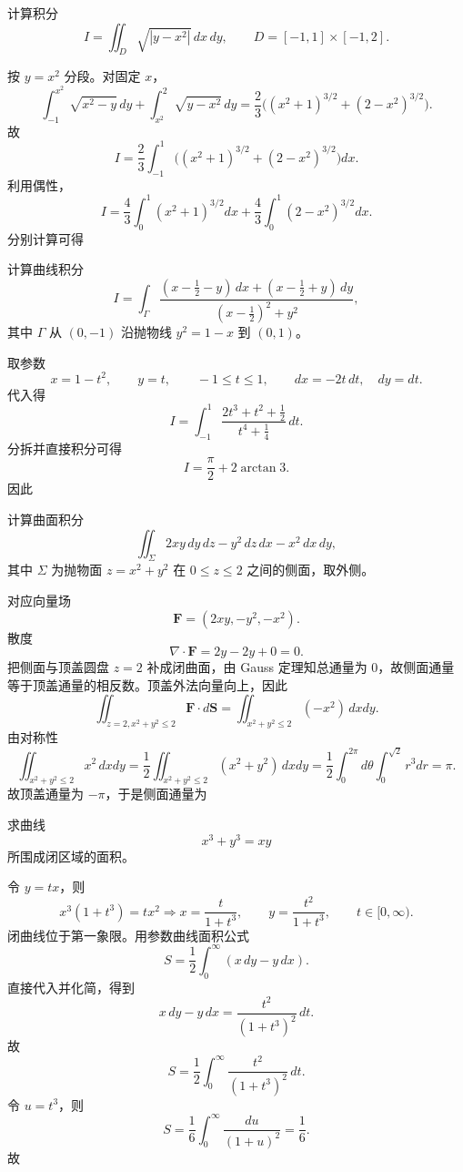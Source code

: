 ﻿


\begin{question}
计算积分
\[
I=\iint_D \sqrt{|y-x^2|}\,dx\,dy,
\qquad D=[-1,1]\times[-1,2].
\]

\begin{solution}

按 $y=x^2$ 分段。对固定 $x$，
\[
\int_{-1}^{x^2}\sqrt{x^2-y}\,dy+\int_{x^2}^{2}\sqrt{y-x^2}\,dy
=\frac23\bigl((x^2+1)^{3/2}+(2-x^2)^{3/2}\bigr).
\]
故
\[
I=\frac23\int_{-1}^{1}\bigl((x^2+1)^{3/2}+(2-x^2)^{3/2}\bigr)dx.
\]
利用偶性，
\[
I=\frac43\int_0^1(x^2+1)^{3/2}dx+\frac43\int_0^1(2-x^2)^{3/2}dx.
\]
分别计算可得
\end{solution}
\end{question}

\begin{question}
计算曲线积分
\[
I=\int_{\Gamma}\frac{(x-\tfrac12-y)\,dx+(x-\tfrac12+y)\,dy}{(x-\tfrac12)^2+y^2},
\]
其中 $\Gamma$ 从 $(0,-1)$ 沿抛物线 $y^2=1-x$ 到 $(0,1)$。
\begin{solution}

取参数
\[
 x=1-t^2,\qquad y=t,\qquad -1\le t\le1,
\qquad dx=-2t\,dt,\quad dy=dt.
\]
代入得
\[
I=\int_{-1}^{1}\frac{2t^3+t^2+\tfrac12}{t^4+\tfrac14}\,dt.
\]
分拆并直接积分可得
\[
I=\frac\pi2+2\arctan 3.
\]
因此
\end{solution}
\end{question}

\begin{question}
计算曲面积分
\[
\iint_{\Sigma}2xy\,dy\,dz-y^2\,dz\,dx-x^2\,dx\,dy,
\]
其中 $\Sigma$ 为抛物面 $z=x^2+y^2$ 在 $0\le z\le2$ 之间的侧面，取外侧。
\begin{solution}

对应向量场
\[
\mathbf F=(2xy,-y^2,-x^2).
\]
散度
\[
\nabla\cdot\mathbf F=2y-2y+0=0.
\]
把侧面与顶盖圆盘 $z=2$ 补成闭曲面，由 Gauss 定理知总通量为 $0$，故侧面通量等于顶盖通量的相反数。顶盖外法向量向上，因此
\[
\iint_{z=2,x^2+y^2\le2}\mathbf F\cdot d\mathbf S=
\iint_{x^2+y^2\le2}(-x^2)\,dxdy.
\]
由对称性
\[
\iint_{x^2+y^2\le2}x^2\,dxdy=\frac12\iint_{x^2+y^2\le2}(x^2+y^2)\,dxdy
=\frac12\int_0^{2\pi}\!d\theta\int_0^{\sqrt2}r^3dr=\pi.
\]
故顶盖通量为 $-\pi$，于是侧面通量为
\end{solution}
\end{question}

\begin{question}
求曲线
\[
 x^3+y^3=xy
\]
所围成闭区域的面积。
\begin{solution}

令 $y=tx$，则
\[
 x^3(1+t^3)=tx^2 \Longrightarrow x=\frac{t}{1+t^3},\qquad y=\frac{t^2}{1+t^3},\qquad t\in[0,\infty).
\]
闭曲线位于第一象限。用参数曲线面积公式
\[
S=\frac12\int_0^{\infty}(x\,dy-y\,dx).
\]
直接代入并化简，得到
\[
 x\,dy-y\,dx=\frac{t^2}{(1+t^3)^2}\,dt.
\]
故
\[
 S=\frac12\int_0^{\infty}\frac{t^2}{(1+t^3)^2}\,dt.
\]
令 $u=t^3$，则
\[
S=\frac16\int_0^{\infty}\frac{du}{(1+u)^2}=\frac16.
\]
故
\end{solution}
\end{question}

